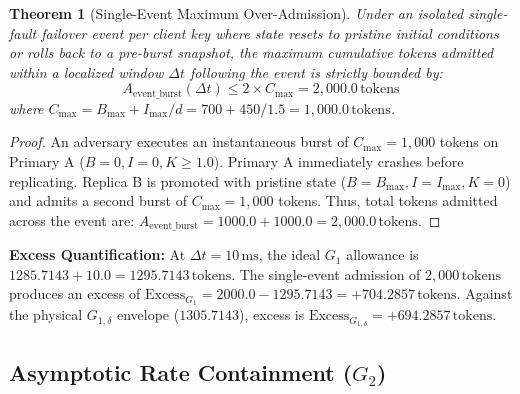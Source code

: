\documentclass[conference]{IEEEtran}
\newtheorem{theorem}{Theorem}
\begin{document}
\begin{theorem}[Single-Event Maximum Over-Admission]
Under an isolated single-fault failover event per client key where state resets to pristine initial conditions or rolls back to a pre-burst snapshot, the maximum cumulative tokens admitted within a localized window $\Delta t$ following the event is strictly bounded by:
\begin{equation}
A_{\text{event\_burst}}(\Delta t) \le 2 \times C_{\max} = 2,000.0\,\text{tokens}
\end{equation}
where $C_{\max} = B_{\max} + I_{\max}/d = 700 + 450/1.5 = 1,000.0\,\text{tokens}$.
\end{theorem}
\begin{proof}
An adversary executes an instantaneous burst of $C_{\max} = 1,000$ tokens on Primary A ($B=0, I=0, K \ge 1.0$). Primary A immediately crashes before replicating. Replica B is promoted with pristine state ($B=B_{\max}, I=I_{\max}, K=0$) and admits a second burst of $C_{\max} = 1,000$ tokens. Thus, total tokens admitted across the event are: $A_{\text{event\_burst}} = 1000.0 + 1000.0 = 2,000.0\,\text{tokens}$.
\end{proof}

\textbf{Excess Quantification:} At $\Delta t = 10\,\text{ms}$, the ideal $G_1$ allowance is $1285.7143 + 10.0 = 1295.7143\,\text{tokens}$. The single-event admission of $2,000\,\text{tokens}$ produces an excess of $\text{Excess}_{G_1} = 2000.0 - 1295.7143 = +704.2857\,\text{tokens}$. Against the physical $G_{1,\delta}$ envelope ($1305.7143$), excess is $\text{Excess}_{G_{1,\delta}} = +694.2857\,\text{tokens}$.

\subsection{Asymptotic Rate Containment ($G_2$)}
\end{document}
